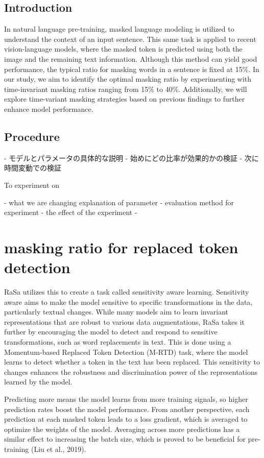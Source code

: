 \subsection{Introduction}
In natural language pre-training, masked language modeling is utilized to understand the context of an input sentence. This same task is applied to recent vision-language models, where the masked token is predicted using both the image and the remaining text information. Although this method can yield good performance, the typical ratio for masking words in a sentence is fixed at 15\%. In our study, we aim to identify the optimal masking ratio by experimenting with time-invariant masking ratios ranging from 15\% to 40\%. Additionally, we will explore time-variant masking strategies based on previous findings to further enhance model performance.

\subsection{Procedure}

- モデルとパラメータの具体的な説明
- 始めにどの比率が効果的かの検証
- 次に時間変動での検証


To experiment on 

- what we are changing  explanation of parameter
- evaluation method for experiment
- the effect of the experiment 
- 

\section{masking ratio for replaced token detection}
RaSa utilizes this to create a task called sensitivity aware learning.
Sensitivity aware aims to make the model sensitive to specific transformations in the data, particularly textual changes. While many models aim to learn invariant representations that are robust to various data augmentations, RaSa takes it further by encouraging the model to detect and respond to sensitive transformations, such as word replacements in text. This is done using a Momentum-based Replaced Token Detection (M-RTD) task, where the model learns to detect whether a token in the text has been replaced. This sensitivity to changes enhances the robustness and discrimination power of the representations learned by the model.


Predicting more means the model learns from more training signals, so higher prediction rates boost the model performance. From another perspective, each prediction at each masked token leads to a loss gradient, which is averaged to optimize the weights of the model. Averaging across more predictions has a similar effect to increasing the batch size, which is proved to be beneficial for pre-training (Liu et al., 2019). 



